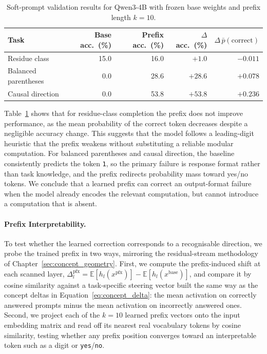 \begin{table}[ht!]
\centering
\small
\begin{tabular}{@{}lrrrr@{}}
\toprule
Task & Base acc.\ (\%) & Prefix acc.\ (\%) & $\Delta$ acc.\ (\%) & $\Delta\,\bar{p}(\mathrm{correct})$ \\
\midrule
Residue class        & 15.0 & 16.0 & $+1.0$  & $-0.011$ \\
Balanced parentheses &  0.0 & 28.6 & $+28.6$ & $+0.078$ \\
Causal direction     &  0.0 & 53.8 & $+53.8$ & $+0.236$ \\
\bottomrule
\end{tabular}
\caption{Soft-prompt validation results for Qwen3-4B with frozen base weights and prefix length $k=10$.}
\label{tab:sp_summary}
\end{table}

Table~\ref{tab:sp_summary} shows that for residue-class completion 
the prefix does not improve performance, 
as the mean probability of the correct 
token decreases despite a negligible accuracy change. 
This suggests that the model follows a leading-digit heuristic 
that the prefix weakens without substituting a reliable 
modular computation. For balanced parentheses and causal
 direction, the baseline consistently predicts the token
  \texttt{1}, so the primary failure is response format 
  rather than task knowledge, and the prefix redirects 
  probability mass toward yes/no tokens. We conclude that
   a learned prefix can correct an output-format 
   failure when the model already encodes the relevant
   computation, but cannot introduce a computation that
    is absent.

\paragraph{Prefix Interpretability.}

To test whether the learned correction corresponds to a recognisable direction, we
probe the trained prefix in two ways, mirroring the residual-stream methodology of
Chapter~\ref{sec:concept_geometry}. First, we compute the prefix-induced shift at
each scanned layer, $\Delta_l^{\mathrm{pfx}} = \mathbb{E}[h_l(x^{\mathrm{pfx}})] -
\mathbb{E}[h_l(x^{\mathrm{base}})]$, and compare it by cosine similarity against a
task-specific steering vector built the same way as the concept deltas in
Equation~\ref{eq:concept_delta}: the mean activation on correctly answered prompts
minus the mean activation on incorrectly answered ones. Second, we project each of
the $k=10$ learned prefix vectors onto the input embedding matrix and read off its
nearest real vocabulary tokens by cosine similarity, testing whether any prefix
position converges toward an interpretable token such as a digit or \texttt{yes}/\texttt{no}.

